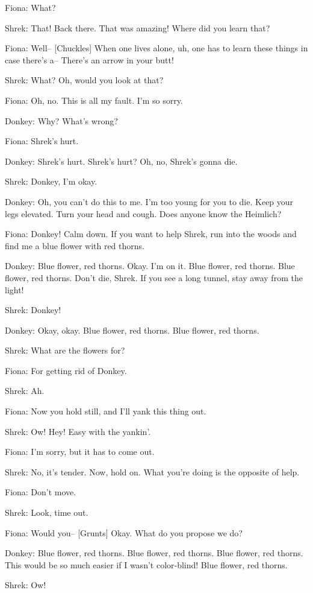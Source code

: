 \documentclass{article}
\begin{document}
Fiona:
What?

Shrek:
That! Back there. That was amazing! Where did you learn that?

Fiona:
Well-- [Chuckles] When one lives alone, uh, one has to learn these things in case there's a-- There's an arrow in your butt!

Shrek:
What? Oh, would you look at that?

Fiona:
Oh, no. This is all my fault. I'm so sorry.

Donkey:
Why? What's wrong?

Fiona:
Shrek's hurt.

Donkey:
Shrek's hurt. Shrek's hurt? Oh, no, Shrek's gonna die.

Shrek:
Donkey, I'm okay.

Donkey:
Oh, you can't do this to me. I'm too young for you to die. Keep your legs elevated. Turn your head and cough. Does anyone know the Heimlich?

Fiona:
Donkey! Calm down. If you want to help Shrek, run into the woods and find me a blue flower with red thorns.

Donkey:
Blue flower, red thorns. Okay. I'm on it. Blue flower, red thorns. Blue flower, red thorns. Don't die, Shrek. If you see a long tunnel, stay away from the light!

Shrek:
Donkey!

Donkey:
Okay, okay. Blue flower, red thorns. Blue flower, red thorns.

Shrek:
What are the flowers for?

Fiona:
For getting rid of Donkey.

Shrek:
Ah.

Fiona:
Now you hold still, and I'll yank this thing out.

Shrek:
Ow! Hey! Easy with the yankin'.

Fiona:
I'm sorry, but it has to come out.

Shrek:
No, it's tender. Now, hold on. What you're doing is the opposite of help.

Fiona:
Don't move.

Shrek:
Look, time out.

Fiona:
Would you-- [Grunts] Okay. What do you propose we do?

Donkey:
Blue flower, red thorns. Blue flower, red thorns. Blue flower, red thorns. This would be so much easier if I wasn't color-blind! Blue flower, red thorns.

Shrek:
Ow!
\end{document}
